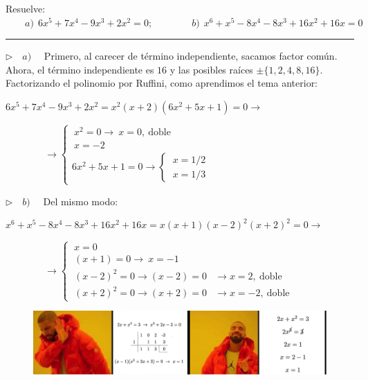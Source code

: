 \begin{miejercicio}

Resuelve: $\qquad a)\ \ 6x^5+7x^4-9x^3+2x^2=0;\qquad \qquad b)\ \ x^6+x^5-8x^4-8x^3+16x^2+16x=0$

\rule{250pt}{0.1pt}

\vspace{2mm} $\triangleright \quad a) \quad $ Primero, al carecer de término independiente, sacamos factor común. Ahora, el término independiente es $16$ y las posibles raíces $\pm\{1,2,4,8,16\}$. Factorizando el polinomio por Ruffini, como aprendimos el tema anterior:

\vspace{2mm} $6x^5+7x^4-9x^3+2x^2=x^2(x+2)(6x^2+5x+1)=0 \to $

\vspace{2mm} $\qquad \qquad  \to \begin{cases}
 	\ x^2=0  \to \ x=0,\ \text{doble} \\ \ x=-2 \\ 6x^2+5x+1=0 \to \begin{cases}
 	\ x=1/2 \\ \ x=1/3 
 	\end{cases}
 \end{cases}$


\vspace{5mm} $\triangleright \quad b) \quad $ Del mismo modo:

\vspace{2mm} $x^6+x^5-8x^4-8x^3+16x^2+16x=x(x+1)(x-2)^2(x+2)^2=0 \to $

\vspace{2mm} $\qquad \qquad \to \begin{cases}
 	\ x=0 \\ \ (x+1)=0 \to \ x=-1 \\ \ (x-2)^2= 0 \to (x-2)= 0 & \to x=2,\ \text{doble} \\ \ (x+2)^2= 0 \to (x+2)= 0 & \to  x=-2,\ \text{doble}
 \end{cases}$
\end{miejercicio}


\vspace{10mm}
\begin{figure}[H]
	\centering
	\includegraphics[width=.95\textwidth]{img-ecc/ecc08.png}
\end{figure}

